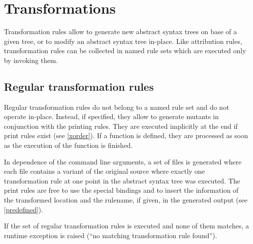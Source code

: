 \chapter{Transformations}\label{trans}

Transformation rules allow to generate new abstract syntax trees
on base of a given tree, or to modify an abstract syntax tree in-place.
Like attribution rules, transformation rules can be collected in named
rule sets which are executed only by invoking them.

\section{Regular transformation rules}\label{regtrans}

Regular transformation rules do not belong to a named rule set and do
not operate in-place. Instead, if specified, they allow to generate
mutants in conjunction with the printing rules. They are executed
implicitly at the end if print rules exist (see \ref{xorder}). If a
 function is defined, they are processed as soon
as the execution of the  function is finished.

In dependence of the command line arguments, a set of files is generated
where each file contains a variant of the original source where exactly
one transformation rule at one point in the abstract syntax tree
was executed. The print rules are free to use the special bindings
 and 
to insert the information of the transformed location and the rulename,
if given, in the generated output (see \ref{predefined}).

If the set of regular transformation rules is executed and none of
them matches, a runtime exception is raised (``no matching transformation
rule found'').

\begin{grammar}
      \produces {} 
	 \lextoken{\{} 
	 \lextoken{\}} \\
      \produces {} \\
      \produces {}
	  \\
      \produces {}
	 \lextoken{->} \nextline
	  \\
      \produces {}
	 \lextoken{->} \nextline {}
	  \\
      \produces {}
	 \lextoken{->} \nextline {}
	  \\
\end{grammar}

